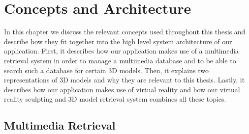 \chapter{Concepts and Architecture}
\label{chap:concepts_and_architecture}

In this chapter we discuss the relevant concepts used throughout this thesis and describe how they fit together into the high level system architecture of our
application. First, it describes how our application makes use of a multimedia retrieval system in order to manage a multimedia database and to be able to search such a database for certain 3D models.
Then, it explains two representations of 3D models and why they are relevant to this thesis. Lastly, it describes how our application makes use of virtual reality and how our virtual reality sculpting and 3D model retrieval system combines all these topics.

\section{Multimedia Retrieval}
\label{sec:multimedia_retrieval_concept}

